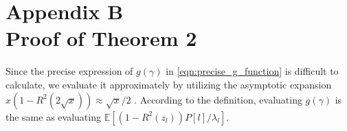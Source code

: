 \documentclass[12pt,draftclsnofoot,journal,onecolumn]{IEEEtran}
\theoremstyle{nonumberplain}
\begin{document}
\section*{Appendix B\\Proof of Theorem 2}
    Since the precise expression of $g(\gamma)$ in \eqref{eqn:precise_g_function} is difficult to calculate, we evaluate it approximately by utilizing the asymptotic expansion $x(1-R^2(2\sqrt{x})) \approx \sqrt{x}/2$ \cite{silverman1972special}. According to the definition, evaluating $g(\gamma)$ is the same as evaluating $\mathbb{E}[(1-R^2(z_l))P[l]/\lambda_l]$. 
\end{document}
